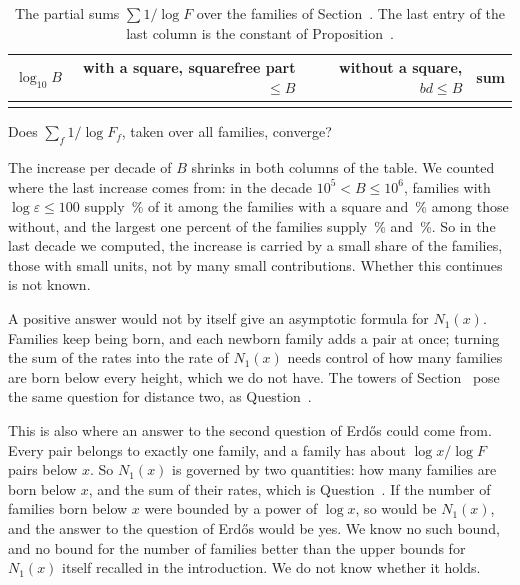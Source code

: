 \begin{table}[ht]
\centering
\small
\begin{tabular}{rrrr}
\hline
$\log_{10} B$ & with a square, squarefree part $\le B$ & without a square, $bd \le B$ & sum \\
\hline
\Z{teilsumtab}
\hline
\end{tabular}
\caption{The partial sums $\sum 1/\log F$ over the families of Section~. The last entry of the last column is the constant
of Proposition~.}\label{tab:teilsum}
\end{table}

\begin{question}
Does $\sum_f 1/\log F_f$, taken over all families, converge?
\end{question}

The increase per decade of $B$ shrinks in both columns of the table. We counted where the last increase comes from: in the decade
$10^5 < B \le 10^6$, families with $\log \varepsilon \le 100$ supply \,\% of it among the families with a square and \,\%
among those without, and the largest one percent of the families supply \,\% and \,\%. So in the last decade we
computed, the increase is carried by a small share of the families, those with small units, not by many small contributions. Whether this
continues is not known.

A positive answer would not by itself give an asymptotic formula for $N_1(x)$. Families keep being born, and each newborn family adds a
pair at once; turning the sum of the rates into the rate of $N_1(x)$ needs control of how many families are born below every height, which we
do not have. The towers of Section~ pose the same question for distance two, as Question~.

This is also where an answer to the second question of Erd\H{o}s could come from. Every pair belongs to exactly one family, and a family has
about $\log x/\log F$ pairs below $x$. So $N_1(x)$ is governed by two quantities: how many families are born below $x$, and the sum of
their rates, which is Question~. If the number of families born below $x$ were bounded by a power of $\log x$, so would
be $N_1(x)$, and the answer to the question of Erd\H{o}s would be yes. We know no such bound, and no bound for the number of families
better than the upper bounds for $N_1(x)$ itself recalled in the introduction. We do not know whether it holds.

